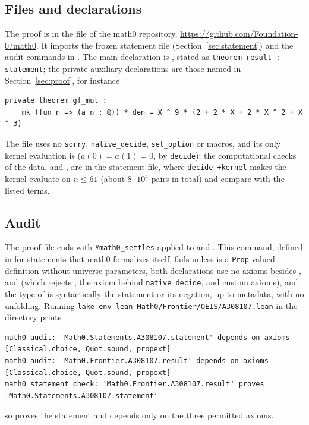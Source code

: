 \documentclass[11pt]{amsart}
\theoremstyle{plain}
\theoremstyle{definition}
\begin{document}
\subsection*{Files and declarations}
The proof is in the file  of the math0 repository, \url{https://github.com/Foundation-0/math0}.
It imports the frozen statement file  (Section~\ref{sec:statement}) and the audit commands in .
The main declaration is , stated as \texttt{theorem result : statement}; the private auxiliary declarations are those named in Section~\ref{sec:proof}, for instance
\begin{lstlisting}
private theorem gf_mul :
    mk (fun n => (a n : ℚ)) * den = X ^ 9 * (2 + 2 * X + 2 * X ^ 2 + X ^ 3)
\end{lstlisting}
The file uses no \texttt{sorry}, \texttt{native\_decide}, \texttt{set\_option} or macros, and its only kernel evaluation is  ($a(0)=a(1)=0$, by \texttt{decide}); the computational checks of the data,  and , are in the statement file, where \texttt{decide +kernel} makes the kernel evaluate  on $n\le61$ (about $8\cdot10^4$ pairs in total) and compare with the listed terms.

\subsection*{Audit}
The proof file ends with \texttt{\#math0\_settles} applied to  and . This command, defined in  for statements that math0 formalizes itself, fails unless  is a \texttt{Prop}-valued definition without universe parameters, both declarations use no axioms besides ,  and  (which rejects , the axiom  behind \texttt{native\_decide}, and custom axioms), and the type of  is syntactically the statement or its negation, up to metadata, with no unfolding.
Running \texttt{lake env lean Math0/Frontier/OEIS/A308107.lean} in the directory  prints\par\nobreak\noindent
\begin{minipage}{\linewidth}
\begin{lstlisting}[basicstyle=\ttfamily\scriptsize]
math0 audit: 'Math0.Statements.A308107.statement' depends on axioms [Classical.choice, Quot.sound, propext]
math0 audit: 'Math0.Frontier.A308107.result' depends on axioms [Classical.choice, Quot.sound, propext]
math0 statement check: 'Math0.Frontier.A308107.result' proves 'Math0.Statements.A308107.statement'
\end{lstlisting}
\end{minipage}
so  proves the statement and depends only on the three permitted axioms.
\end{document}
